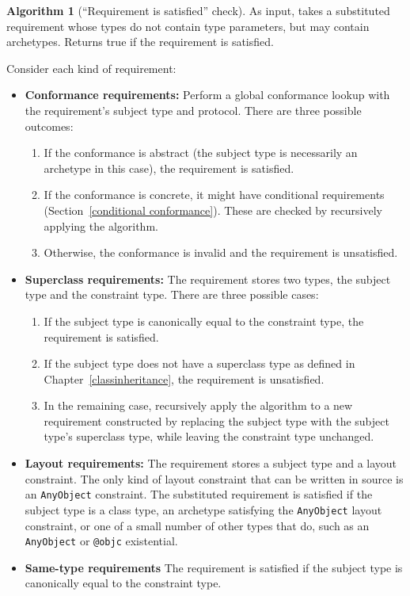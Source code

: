 \documentclass[a4paper,headsepline,bibliography=totoc,toc=flat,fleqn,twoside=semi]{scrbook}
\theoremstyle{definition}
\theoremstyle{definition}
\theoremstyle{definition}
\newtheorem{algorithm}{Algorithm}[chapter]
\begin{document}
\begin{algorithm}[``Requirement is satisfied'' check]\label{reqissatisfied}
As input, takes a substituted requirement whose types do not contain type parameters, but may contain archetypes. Returns true if the requirement is satisfied.

Consider each kind of requirement:
\begin{itemize}
\item \textbf{Conformance requirements:} Perform a global conformance lookup with the requirement's subject type and protocol. There are three possible outcomes:
\begin{enumerate}
\item If the conformance is abstract (the subject type is necessarily an archetype in this case), the requirement is satisfied.
\item If the conformance is concrete, it might have conditional requirements (Section~\ref{conditional conformance}). These are checked by recursively applying the algorithm.
\item Otherwise, the conformance is invalid and the requirement is unsatisfied.
\end{enumerate}
\item \textbf{Superclass requirements:} The requirement stores two types, the subject type and the constraint type. There are three possible cases:
\begin{enumerate}
\item If the subject type is canonically equal to the constraint type, the requirement is satisfied.
\item If the subject type does not have a superclass type as defined in Chapter~\ref{classinheritance}, the requirement is unsatisfied.
\item In the remaining case, recursively apply the algorithm to a new requirement constructed by replacing the subject type with the subject type's superclass type, while leaving the constraint type unchanged.
\end{enumerate}
\item \textbf{Layout requirements:} The requirement stores a subject type and a layout constraint. The only kind of layout constraint that can be written in source is an \texttt{AnyObject} constraint. The substituted requirement is satisfied if the subject type is a class type, an archetype satisfying the \texttt{AnyObject} layout constraint, or one of a small number of other types that do, such as an \texttt{AnyObject} or \texttt{@objc} existential.
\item \textbf{Same-type requirements} The requirement is satisfied if the subject type is canonically equal to the constraint type.
\end{itemize}
\end{algorithm}
\end{document}
